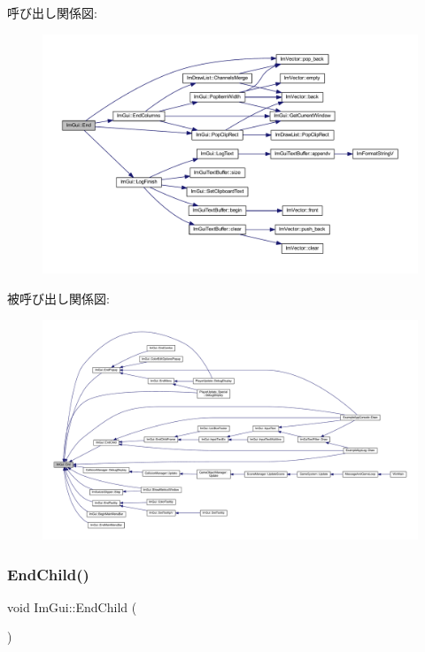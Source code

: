 呼び出し関係図\+:\nopagebreak
\begin{figure}[H]
\begin{center}
\leavevmode
\includegraphics[width=350pt]{namespace_im_gui_a5479d93794a004c67ceb6d13f37c8254_cgraph}
\end{center}
\end{figure}
被呼び出し関係図\+:
\nopagebreak
\begin{figure}[H]
\begin{center}
\leavevmode
\includegraphics[width=350pt]{namespace_im_gui_a5479d93794a004c67ceb6d13f37c8254_icgraph}
\end{center}
\end{figure}
\mbox{\label{namespace_im_gui_af8de559a88c1442d6df8c1b04c86e997}} 
\subsubsection{\texorpdfstring{End\+Child()}{EndChild()}}
{\footnotesize\ttfamily void Im\+Gui\+::\+End\+Child (\begin{DoxyParamCaption}{ }\end{DoxyParamCaption})}



